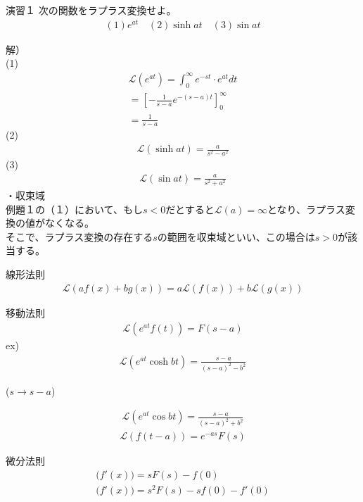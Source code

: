 \documentclass{jsarticle}
\begin{document}
\begin{itembox}[l]{演習１}
次の関数をラプラス変換せよ。
\begin{eqnarray}
(1)e^{at} \quad
(2)\sinh at \quad
(3)\sin at
\end{eqnarray}
\end{itembox}
解）\\
(1)
\begin{eqnarray}
\mathcal{L}(e^{at})=\int_{0}^{\infty}e^{-st}\cdot e^{at}dt\\
=\left[-\frac{1}{s-a}e^{-(s-a)t}\right]_{0}^{\infty}\\
=\frac{1}{s-a}
\end{eqnarray}
(2)
\begin{eqnarray}
\mathcal{L}(\sinh at)=\frac{a}{s^2-a^2}
\end{eqnarray}
(3)
\begin{eqnarray}
\mathcal{L}(\sin at)=\frac{a}{s^2+a^2}
\end{eqnarray}
・収束域\\
例題１の（１）において、もし$s<0$だとすると$\mathcal{L}(a)=\infty$となり、ラプラス変換の値がなくなる。\\
そこで、ラプラス変換の存在する$s$の範囲を収束域といい、この場合は$s>0$が該当する。\\
\begin{itembox}[l]{線形法則}
\begin{eqnarray}
\mathcal{L}(af(x)+bg(x))=a\mathcal{L}(f(x))+b\mathcal{L}(g(x))
\end{eqnarray}
\end{itembox}
\begin{itembox}[l]{移動法則}
\begin{eqnarray}
\mathcal{L}(e^{at}f(t))=F(s-a)
\end{eqnarray}
ex)
\begin{eqnarray}
\mathcal{L}(e^{at}\cosh bt)=\frac{s-a}{(s-a)^2-b^2}
\end{eqnarray}
\centerline{($s\rightarrow s-a$)}
\begin{eqnarray}
\mathcal{L}(e^{at}\cos bt)=\frac{s-a}{(s-a)^2+b^2}
\end{eqnarray}
\begin{eqnarray}
\mathcal{L}(f(t-a))=e^{-as}F(s)
\end{eqnarray}
\end{itembox}
\begin{itembox}[l]{微分法則}
\begin{eqnarray}
\mathcal(f'(x))=sF(s)-f(0)\\
\mathcal(f'(x))=s^2F(s)-sf(0)-f'(0)
\end{eqnarray}
\end{itembox}
\end{document}
